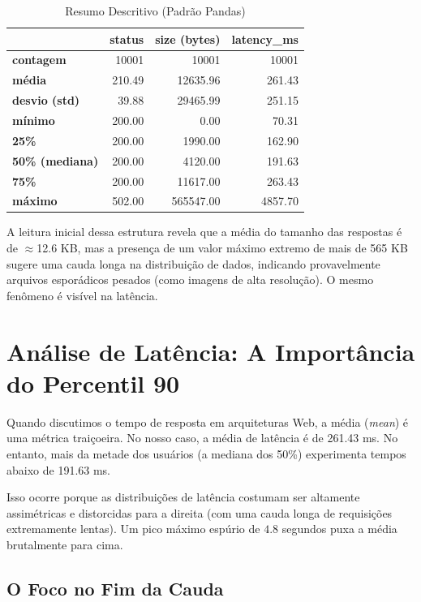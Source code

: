 \documentclass[12pt,a4paper,twoside]{report}
\begin{document}
\begin{table}[h]
\centering
\caption{Resumo Descritivo (Padrão Pandas)}
\begin{tabular}{lrrr}
\toprule
 & \textbf{status} & \textbf{size (bytes)} & \textbf{latency\_ms} \\
\midrule
\textbf{contagem} & 10001 & 10001 & 10001 \\
\textbf{média} & 210.49 & 12635.96 & 261.43 \\
\textbf{desvio (std)} & 39.88 & 29465.99 & 251.15 \\
\textbf{mínimo} & 200.00 & 0.00 & 70.31 \\
\textbf{25\%} & 200.00 & 1990.00 & 162.90 \\
\textbf{50\% (mediana)} & 200.00 & 4120.00 & 191.63 \\
\textbf{75\%} & 200.00 & 11617.00 & 263.43 \\
\textbf{máximo} & 502.00 & 565547.00 & 4857.70 \\
\bottomrule
\end{tabular}
\end{table}

A leitura inicial dessa estrutura revela que a média do tamanho das respostas é de $\approx$12.6 KB, mas a presença de um valor máximo extremo de mais de 565 KB sugere uma cauda longa na distribuição de dados, indicando provavelmente arquivos esporádicos pesados (como imagens de alta resolução). O mesmo fenômeno é visível na latência.

\section{Análise de Latência: A Importância do Percentil 90}

Quando discutimos o tempo de resposta em arquiteturas Web, a média (\textit{mean}) é uma métrica traiçoeira. No nosso caso, a média de latência é de 261.43 ms. No entanto, mais da metade dos usuários (a mediana dos 50\%) experimenta tempos abaixo de 191.63 ms. 

Isso ocorre porque as distribuições de latência costumam ser altamente assimétricas e distorcidas para a direita (com uma cauda longa de requisições extremamente lentas). Um pico máximo espúrio de $4.8$ segundos puxa a média brutalmente para cima.

\subsection{O Foco no Fim da Cauda}
\end{document}

